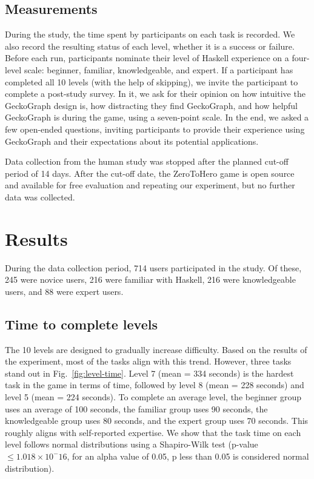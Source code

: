 \subsection{Measurements}
During the study, the time spent by participants on each task is recorded. We also record the resulting status of each level, whether it is a success or failure. Before each run, participants nominate their level of Haskell experience on a four-level scale: beginner, familiar,  knowledgeable, and expert.  If a participant has completed all 10 levels (with the help of skipping), we invite the participant to complete a post-study survey. In it, we ask for their opinion on how intuitive the GeckoGraph design is, how distracting they find GeckoGraph, and how helpful GeckoGraph is during the game, using a seven-point scale. In the end, we asked a few open-ended questions, inviting participants to provide their experience using GeckoGraph and their expectations about its potential applications.

Data collection from the human study was stopped after the planned cut-off period of 14 days. After the cut-off date, the ZeroToHero game is open source and available for free evaluation \cite{Fu2023-ne} and repeating our experiment, but no further data was collected. 

\section{Results}

During the data collection period, 714 users participated in the study. Of these, 245 were novice users, 216 were familiar with Haskell, 216 were knowledgeable users, and 88 were expert users. 


\subsection{Time to complete levels}

The 10 levels are designed to gradually increase difficulty. Based on the results of the experiment, most of the tasks align with this trend. However, three tasks stand out in Fig.~\ref{fig:level-time}.  Level 7 (mean = 334 seconds) is the hardest task in the game in terms of time, followed by level 8 (mean = 228 seconds) and level 5 (mean = 224 seconds). To complete an average level, the beginner group uses an average of 100 seconds, the familiar group uses 90 seconds, the knowledgeable group uses 80 seconds, and the expert group uses 70 seconds. This roughly aligns with self-reported expertise. We show that the task time on each level follows normal distributions using a Shapiro-Wilk test \cite{Shaphiro1965-dx} (p-value  $ \leq 1.018 \times 10^-16$, for an alpha value of 0.05, p less than 0.05 is considered normal distribution).

